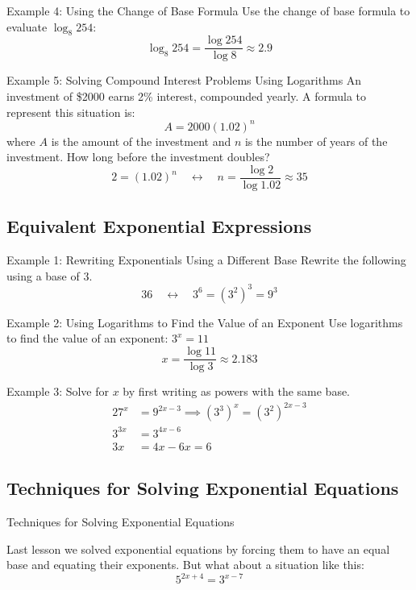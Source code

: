 \documentclass{article}
\begin{document}
\begin{examplebox}{Example 4: Using the Change of Base Formula}
Use the change of base formula to evaluate \(\log_8{254}\):
\[
\log_8{254} = \frac{\log{254}}{\log{8}} \approx 2.9
\]
\end{examplebox}

\begin{examplebox}{Example 5: Solving Compound Interest Problems Using Logarithms}
An investment of \$2000 earns 2\% interest, compounded yearly. A formula to represent this situation is:
\[
A = 2000 (1.02)^n
\]
where \( A \) is the amount of the investment and \( n \) is the number of years of the investment. How long before the investment doubles?
\[
2 = (1.02)^n \quad \leftrightarrow \quad n = \frac{\log{2}}{\log{1.02}} \approx 35
\]
\end{examplebox}

\subsection{Equivalent Exponential Expressions}

\begin{examplebox}{Example 1: Rewriting Exponentials Using a Different Base}
Rewrite the following using a base of 3.
\[
36 \quad \leftrightarrow \quad 3^6 = (3^2)^3 = 9^3
\]
\end{examplebox}

\begin{examplebox}{Example 2: Using Logarithms to Find the Value of an Exponent}
Use logarithms to find the value of an exponent: \( 3^x = 11 \)
\[
x = \frac{\log{11}}{\log{3}} \approx 2.183
\]
\end{examplebox}
\begin{examplebox}{Example 3: Solve for \( x \) by first writing as powers with the same base.}
\begin{align*}
    27^x &= 9^{2x-3} \implies (3^3)^x = (3^2)^{2x-3} \\ 
    3^{3x} &= 3^{4x-6}  \\
    3x &= 4x-6 x = 6
\end{align*}
\end{examplebox}
\subsection{Techniques for Solving Exponential Equations}
\begin{lessonbox}{Techniques for Solving Exponential Equations}


Last lesson we solved exponential equations by forcing them to have an equal base and equating their exponents. But what about a situation like this:
\[
5^{2x+4} = 3^{x-7}
\]
\end{lessonbox}
\end{document}
